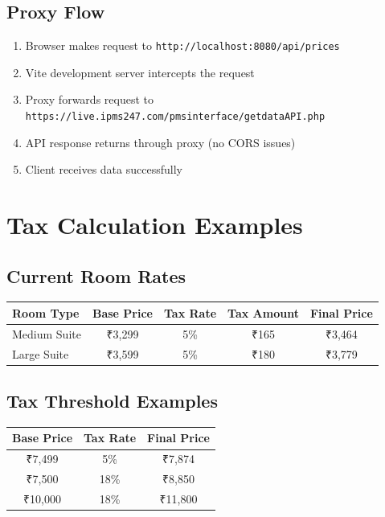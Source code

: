 \documentclass[12pt]{article}
\begin{document}
\subsection{Proxy Flow}
\begin{enumerate}
    \item Browser makes request to \texttt{http://localhost:8080/api/prices}
    \item Vite development server intercepts the request
    \item Proxy forwards request to \texttt{https://live.ipms247.com/pmsinterface/getdataAPI.php}
    \item API response returns through proxy (no CORS issues)
    \item Client receives data successfully
\end{enumerate}

\section{Tax Calculation Examples}

\subsection{Current Room Rates}
\begin{center}
\begin{tabular}{|l|c|c|c|c|}
\hline
\textbf{Room Type} & \textbf{Base Price} & \textbf{Tax Rate} & \textbf{Tax Amount} & \textbf{Final Price} \\
\hline
Medium Suite & ₹3,299 & 5\% & ₹165 & ₹3,464 \\
Large Suite & ₹3,599 & 5\% & ₹180 & ₹3,779 \\
\hline
\end{tabular}
\end{center}

\subsection{Tax Threshold Examples}
\begin{center}
\begin{tabular}{|c|c|c|}
\hline
\textbf{Base Price} & \textbf{Tax Rate} & \textbf{Final Price} \\
\hline
₹7,499 & 5\% & ₹7,874 \\
₹7,500 & 18\% & ₹8,850 \\
₹10,000 & 18\% & ₹11,800 \\
\hline
\end{tabular}
\end{center}
\end{document}
